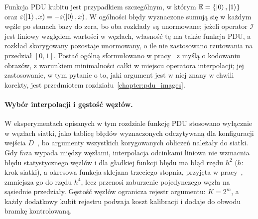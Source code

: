 Funkcja PDU kubitu jest przypadkiem szczególnym, w którym $\mathbb{E}=\{\ket{0},\ket{1}\}$ oraz $\varepsilon(\ket{1},x)=-\varepsilon(\ket{0},x)$.
W ogólności błędy wyznaczone sumują się w każdym węźle po stanach bazy do zera, bo oba rozkłady są unormowane; jeżeli operator $\mathcal{I}$ jest liniowy względem wartości w węzłach, własność tę ma także funkcja PDU, a rozkład skorygowany pozostaje unormowany, o ile nie zastosowano rzutowania na przedział $[0,1]$.
Postać ogólną sformułowano w pracy~\cite{werner_error_reduction_2025} z myślą o kodowaniu obrazów, z warunkiem minimalności całki w miejscu operatora interpolacji; jej zastosowanie, w tym pytanie o to, jaki argument jest w niej znany w chwili korekty, jest przedmiotem rozdziału~\ref{chapter:pdu_images}.

\paragraph{Wybór interpolacji i gęstość węzłów.}
W eksperymentach opisanych w tym rozdziale funkcję PDU stosowano wyłącznie w węzłach siatki, jako tablicę błędów wyznaczonych odczytywaną dla konfiguracji wejścia $D$~\cite{werner_magisterka_2022}, bo argumenty wszystkich korygowanych obliczeń należały do siatki.
Gdy faza wypada między węzłami, interpolacja odcinkami liniowa nie wzmacnia błędu statystycznego węzłów i dla gładkiej funkcji błędu ma błąd rzędu $h^{2}$ ($h$: krok siatki), a okresowa funkcja sklejana trzeciego stopnia, przyjęta w pracy~\cite{werner_error_reduction_2025}, zmniejsza go do rzędu $h^{4}$, lecz przenosi zaburzenie pojedynczego węzła na sąsiednie przedziały.
Gęstość węzłów ogranicza rejestr argumentu: $K=2^{m}$, a każdy dodatkowy kubit rejestru podwaja koszt kalibracji i dodaje do obwodu bramkę kontrolowaną.


